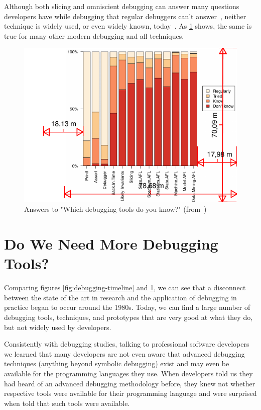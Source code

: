 Although both slicing and omniscient debugging can answer many \linebreak questions developers have while debugging that regular debuggers can't \linebreak answer~\cite{ko07:information_needs_in_collocated, storey97:how_do_program_understanding, sillito06:questions_programmers_ask}, neither technique is widely used, or even widely known, today~\cite{perscheid17:studying_the_advancement}.
As \cref{fig:tool-usage} shows, the same is true for many other modern debugging and \ac{afl} techniques.

\begin{figure}[t]
\centering
\includegraphics[width=.8\linewidth]{img/tool-usage}
\caption[Answers to "Which debugging tools do you know?"]{Answers to "Which debugging tools do you know?" (from~\cite{perscheid17:studying_the_advancement})}
\label{fig:tool-usage}
\end{figure}

\section{Do We Need More Debugging Tools?}

Comparing figures \ref{fig:debugging-timeline} and \ref{fig:tool-usage}, we can see that a disconnect between the state of the art in research and the application of debugging in practice began to occur around the 1980s.
Today, we can find a large number of debugging tools, techniques, and prototypes that are very good at what they do, but not widely used by developers.

Consistently with debugging studies, talking to professional software developers we learned that many developers are not even aware that advanced debugging techniques (\ie anything beyond symbolic debugging) exist and may even be available for the programming languages they use.
When developers told us they had heard of an advanced debugging methodology before, they knew not whether respective tools were available for their programming language and were surprised when told that such tools were available.


